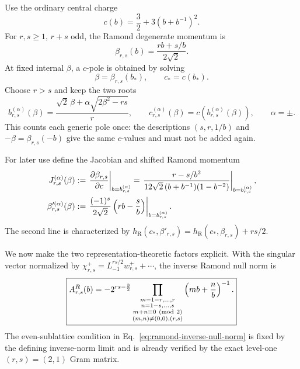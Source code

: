 \documentclass[11pt]{article}
\newcommand{\R}{\mathrm R}
\begin{document}
Use the ordinary central charge
\begin{equation}
 c(b)=\frac32+3(b+b^{-1})^2.
 \label{eq:central-charge}
\end{equation}
For \(r,s\ge1\), \(r+s\) odd, the Ramond degenerate momentum is
\begin{equation}
 \beta_{r,s}(b)=\frac{rb+s/b}{2\sqrt2}.
 \label{eq:kac-beta}
\end{equation}
At fixed internal \(\beta\), a \(c\)-pole is obtained by solving
\begin{equation}
 \beta=\beta_{r,s}(b_*),
 \qquad
 c_*=c(b_*).
 \label{eq:c-pole}
\end{equation}
Choose \(r>s\) and keep the two roots
\begin{equation}
 b_{r,s}^{(\alpha)}(\beta)
 =
 \frac{\sqrt2\,\beta+
 \alpha\sqrt{2\beta^2-rs}}{r},
 \qquad
 c_{r,s}^{(\alpha)}(\beta)
 =
 c\!\left(b_{r,s}^{(\alpha)}(\beta)\right),
 \qquad \alpha=\pm.
 \label{eq:c-pole-roots}
\end{equation}
This counts each generic pole once: the descriptions
\((s,r,1/b)\) and \(-\beta=\beta_{r,s}(-b)\) give the same \(c\)-values
and must not be added again.

For later use define the Jacobian and shifted Ramond momentum
\begin{align}
 J_{r,s}^{(\alpha)}(\beta)
 &:=
 \left.
 \frac{\partial\beta_{r,s}}{\partial c}
 \right|_{b=b_{r,s}^{(\alpha)}}
 =
 \left.
 \frac{r-s/b^2}
 {12\sqrt2\,(b+b^{-1})(1-b^{-2})}
 \right|_{b=b_{r,s}^{(\alpha)}},
 \notag\\
 \beta_{r,s}^{\prime(\alpha)}(\beta)
 &:=
 \left.
 \frac{(-1)^s}{2\sqrt2}
 \left(rb-\frac{s}{b}\right)
 \right|_{b=b_{r,s}^{(\alpha)}} .
 \label{eq:c-pole-jacobian-shift}
\end{align}
The second line is characterized by
\(h_\R(c_*,\beta'_{r,s})=
h_\R(c_*,\beta_{r,s})+rs/2\).

We now make the two representation-theoretic factors explicit.  With
the singular vector normalized by
\(\chi_{r,s}^+=L_{-1}^{rs/2}w_{r,s}^++\cdots\), the inverse Ramond null
norm is
\begin{equation}
 \boxed{
 A^R_{r,s}(b)
 =
 -2^{rs-\frac32}
 \prod_{\substack{
  m=1-r,\ldots,r\\
  n=1-s,\ldots,s\\
  m+n\equiv0\ ({\rm mod}\ 2)\\
  (m,n)\ne(0,0),(r,s)}}
 \left(mb+\frac{n}{b}\right)^{-1}.}
 \label{eq:ramond-inverse-null-norm}
\end{equation}
The even-sublattice condition in
Eq.~\eqref{eq:ramond-inverse-null-norm} is fixed by the defining
inverse-norm limit and is already verified by the exact level-one
\((r,s)=(2,1)\) Gram matrix.
\end{document}
